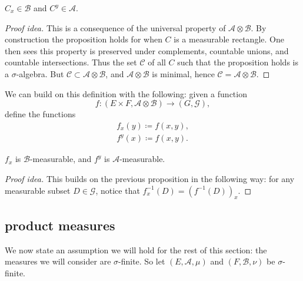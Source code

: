 \documentclass[12pt]{article}
\begin{document}
\begin{proposition}[]
	$C_x\in \mathcal{B}$ and $C^y\in \mathcal{A}$.
\end{proposition}
\begin{proof}[Proof idea]
	This is a consequence of the universal property of $\mathcal{A}\otimes\mathcal{B}$. By construction the proposition holds for when $C$ is a measurable rectangle. One then sees this property is preserved under complements, countable unions, and countable intersections. Thus the set $\mathcal{C}$ of all $C$ such that the proposition holds is a $\sigma$-algebra. But $\mathcal{C}\subset\mathcal{A}\otimes\mathcal{B}$, and $\mathcal{A}\otimes\mathcal{B}$ is minimal, hence $\mathcal{C}=\mathcal{A}\otimes\mathcal{B}$.
\end{proof}

We can build on this definition with the following: given a function
\begin{equation*}
	f:(E\times F,\mathcal{A}\otimes\mathcal{B})\to (G,\mathcal{G}),
\end{equation*}
define the functions
\begin{gather*}
	f_x(y)\coloneqq f(x,y), \\
	f^y(x)\coloneqq f(x,y).
\end{gather*}

\begin{proposition}[]
	$f_x$ is $\mathcal{B}$-measurable, and $f^y$ is $\mathcal{A}$-measurable.
\end{proposition}
\begin{proof}[Proof idea]
	This builds on the previous proposition in the following way: for any measurable subset $D\in\mathcal{G}$, notice that $f_x^{-1}(D)=(f^{-1}(D))_x$.
\end{proof}


\subsection{product measures} %

We now state an assumption we will hold for the rest of this section: the measures we will consider are $\sigma$-finite. So let $(E,\mathcal{A},\mu)$ and $(F,\mathcal{B},\nu)$ be $\sigma$-finite.
\end{document}
